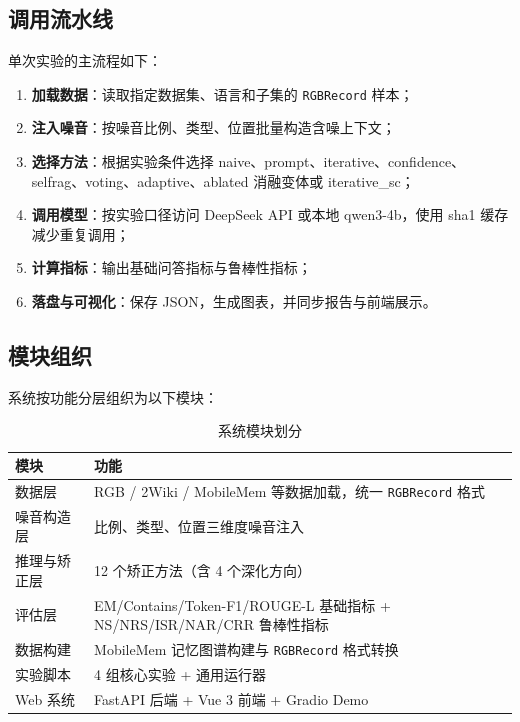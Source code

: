 \documentclass[UTF8,zihao=-4]{ctexart}
\begin{document}
\subsection{调用流水线}
单次实验的主流程如下：

\begin{enumerate}
  \item \textbf{加载数据}：读取指定数据集、语言和子集的 \texttt{RGBRecord} 样本；
  \item \textbf{注入噪音}：按噪音比例、类型、位置批量构造含噪上下文；
  \item \textbf{选择方法}：根据实验条件选择 naive、prompt、iterative、confidence、selfrag、voting、adaptive、ablated 消融变体或 iterative\_sc；
  \item \textbf{调用模型}：按实验口径访问 DeepSeek API 或本地 qwen3-4b，使用 sha1 缓存减少重复调用；
  \item \textbf{计算指标}：输出基础问答指标与鲁棒性指标；
  \item \textbf{落盘与可视化}：保存 JSON，生成图表，并同步报告与前端展示。
\end{enumerate}

\subsection{模块组织}

系统按功能分层组织为以下模块：

\begin{table}[H]
  \centering
  \caption{系统模块划分}
  \begin{tabularx}{\textwidth}{lY}
    \toprule
    模块 & 功能 \\
    \midrule
    数据层 & RGB / 2Wiki / MobileMem 等数据加载，统一 \texttt{RGBRecord} 格式 \\
    噪音构造层 & 比例、类型、位置三维度噪音注入 \\
    推理与矫正层 & 12 个矫正方法（含 4 个深化方向） \\
    评估层 & EM/Contains/Token-F1/ROUGE-L 基础指标 + NS/NRS/ISR/NAR/CRR 鲁棒性指标 \\
    数据构建 & MobileMem 记忆图谱构建与 \texttt{RGBRecord} 格式转换 \\
    实验脚本 & 4 组核心实验 + 通用运行器 \\
    Web 系统 & FastAPI 后端 + Vue 3 前端 + Gradio Demo \\
    \bottomrule
  \end{tabularx}
\end{table}
\end{document}
